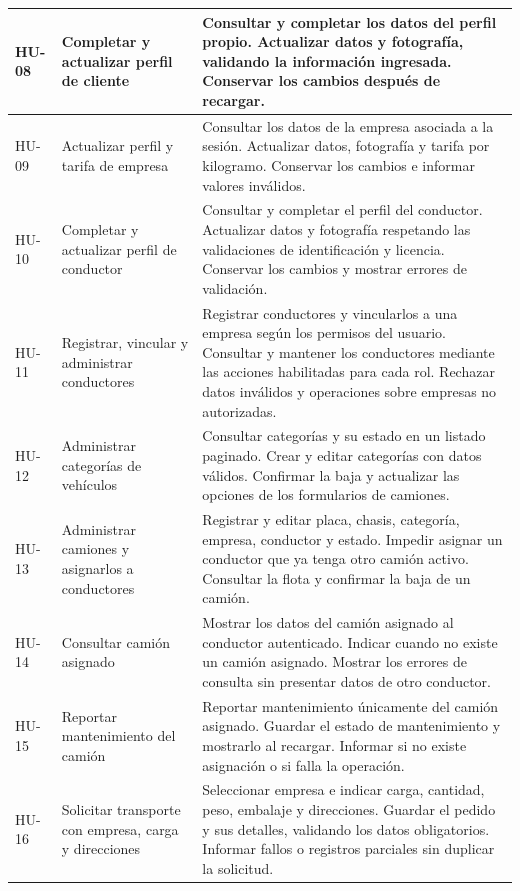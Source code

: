 \begin{longtable}{@{}>{\RaggedRight\arraybackslash}p{1.7cm}>{\RaggedRight\arraybackslash}p{3.9cm}>{\RaggedRight\arraybackslash}p{10.1cm}@{}}
		HU-08 & Completar y actualizar perfil de cliente & Consultar y completar los datos del perfil propio. Actualizar datos y fotografía, validando la información ingresada. Conservar los cambios después de recargar. \\ \midrule
		HU-09 & Actualizar perfil y tarifa de empresa & Consultar los datos de la empresa asociada a la sesión. Actualizar datos, fotografía y tarifa por kilogramo. Conservar los cambios e informar valores inválidos. \\ \midrule
		HU-10 & Completar y actualizar perfil de conductor & Consultar y completar el perfil del conductor. Actualizar datos y fotografía respetando las validaciones de identificación y licencia. Conservar los cambios y mostrar errores de validación. \\ \midrule
		HU-11 & Registrar, vincular y administrar conductores & Registrar conductores y vincularlos a una empresa según los permisos del usuario. Consultar y mantener los conductores mediante las acciones habilitadas para cada rol. Rechazar datos inválidos y operaciones sobre empresas no autorizadas. \\ \midrule
		HU-12 & Administrar categorías de vehículos & Consultar categorías y su estado en un listado paginado. Crear y editar categorías con datos válidos. Confirmar la baja y actualizar las opciones de los formularios de camiones. \\ \midrule
		HU-13 & Administrar camiones y asignarlos a conductores & Registrar y editar placa, chasis, categoría, empresa, conductor y estado. Impedir asignar un conductor que ya tenga otro camión activo. Consultar la flota y confirmar la baja de un camión. \\ \midrule
		HU-14 & Consultar camión asignado & Mostrar los datos del camión asignado al conductor autenticado. Indicar cuando no existe un camión asignado. Mostrar los errores de consulta sin presentar datos de otro conductor. \\ \midrule
		HU-15 & Reportar mantenimiento del camión & Reportar mantenimiento únicamente del camión asignado. Guardar el estado de mantenimiento y mostrarlo al recargar. Informar si no existe asignación o si falla la operación. \\ \midrule
		HU-16 & Solicitar transporte con empresa, carga y direcciones & Seleccionar empresa e indicar carga, cantidad, peso, embalaje y direcciones. Guardar el pedido y sus detalles, validando los datos obligatorios. Informar fallos o registros parciales sin duplicar la solicitud. \\ \midrule

\end{longtable}
